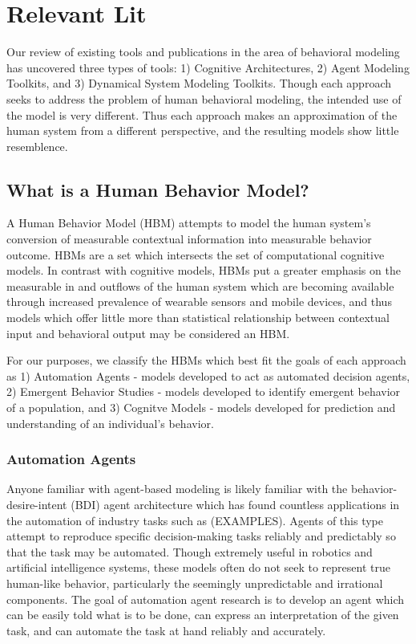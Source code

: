 \section{Relevant Lit}


Our review of existing tools and publications in the area of behavioral modeling has uncovered three types of tools: 1) Cognitive Architectures, 2) Agent Modeling Toolkits, and 3) Dynamical System Modeling Toolkits. 
Though each approach seeks to address the problem of human behavioral modeling, the intended use of the model is very different. 
Thus each approach makes an approximation of the human system from a different perspective, and the resulting models show little resemblence.


\subsection{What is a Human Behavior Model?}
A Human Behavior Model (HBM) attempts to model the human system’s conversion of measurable contextual information into measurable behavior outcome. 
HBMs are a set which intersects the set of computational cognitive models.
In contrast with cognitive models, HBMs put a greater emphasis on the measurable in and outflows of the human system which are becoming available through increased prevalence of wearable sensors and mobile devices, and thus models which offer little more than statistical relationship between contextual input and behavioral output may be considered an HBM.



For our purposes, we classify the HBMs which best fit the goals of each approach as 1) Automation Agents - models developed to act as automated decision agents, 2) Emergent Behavior Studies - models developed to identify emergent behavior of a population, and 3) Cognitve Models - models developed for prediction and understanding of an individual's behavior. 

\subsubsection{Automation Agents}
Anyone familiar with agent-based modeling is likely familiar with the behavior-desire-intent (BDI) agent architecture which has found countless applications in the automation of industry tasks such as (EXAMPLES). 
Agents of this type attempt to reproduce specific decision-making tasks reliably and predictably so that the task may be automated. 
Though extremely useful in robotics and artificial intelligence systems, these models often do not seek to represent true human-like behavior, particularly the seemingly unpredictable and irrational components. 
The goal of automation agent research is to develop an agent which can be easily told what is to be done, can express an interpretation of the given task, and can automate the task at hand reliably and accurately.

